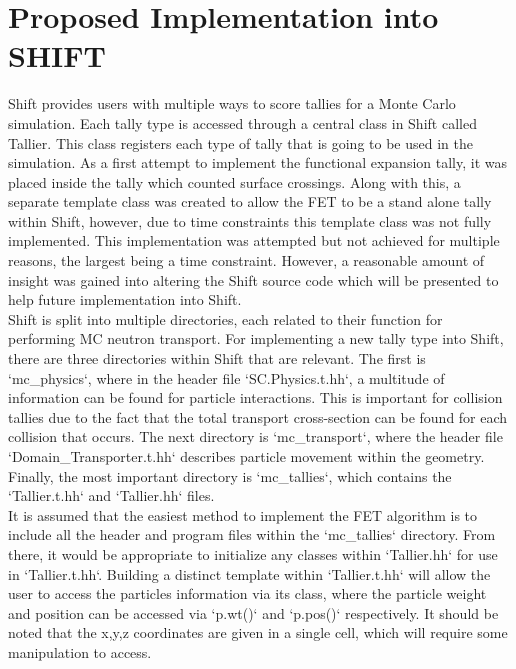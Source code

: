 \documentclass[10tma4paper]{article}
\begin{document}
\section{Proposed Implementation into SHIFT}\label{shift}
Shift provides users with multiple ways to score tallies for a Monte Carlo simulation. Each tally type is accessed through a central class in Shift called Tallier. This class registers each type of tally that is going to be used in the simulation. As a first attempt to implement the functional expansion tally, it was placed inside the tally which counted surface crossings. Along with this, a separate template class was created to allow the FET to be a stand alone tally within Shift, however, due to time constraints this template class was not fully implemented. This implementation was attempted but not achieved for multiple reasons, the largest being a time constraint. However, a reasonable amount of insight was gained into altering the Shift source code which will be presented to help future implementation into Shift. 
\\
Shift is split into multiple directories, each related to their function for performing MC neutron transport. For implementing a new tally type into Shift, there are three directories within Shift that are relevant. The first is `mc\_physics`, where in the header file `SC.Physics.t.hh`, a multitude of information can be found for particle interactions. This is important for collision tallies due to the fact that the total transport cross-section can be found for each collision that occurs. The next directory is `mc\_transport`, where the header file `Domain\_Transporter.t.hh` describes particle movement within the geometry. Finally, the most important directory is `mc\_tallies`, which contains the `Tallier.t.hh` and `Tallier.hh` files. 
\\
It is assumed that the easiest method to implement the FET algorithm is to include all the header and program files within the `mc\_tallies` directory. From there, it would be appropriate to initialize any classes within `Tallier.hh` for use in `Tallier.t.hh`. Building a distinct template within `Tallier.t.hh` will allow the user to access the particles information via its class, where the particle weight and position can be accessed via `p.wt()` and `p.pos()` respectively. It should be noted that the x,y,z coordinates are given in a single cell, which will require some manipulation to access.
\end{document}
